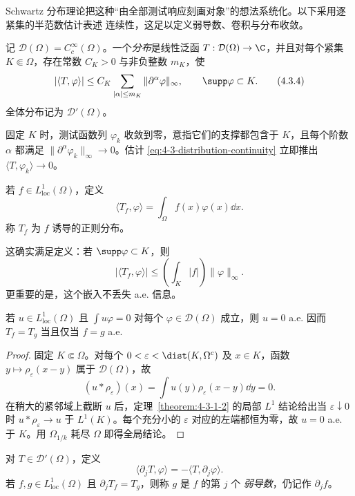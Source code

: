 Schwartz 分布理论把这种“由全部测试响应刻画对象”的想法系统化。以下采用逐紧集的半范数估计表述
连续性，这足以定义弱导数、卷积与分布收敛。

\begin{definition}[测试函数与分布]\label{def:4-3-2-1}
记 $\mathcal D(\Omega)=C_c^\infty(\Omega)$。一个\emph{分布}是线性泛函
$T:\mathcal D(\Omega)\to\C$，并且对每个紧集 $K\Subset\Omega$，存在常数
$C_K>0$ 与非负整数 $m_K$，使
\[
 |\langle T,\varphi\rangle|
 \leq C_K\sum_{|\alpha|\leq m_K}\|\partial^\alpha\varphi\|_\infty,
 \qquad \supp\varphi\subset K.
 \tag{4.3.4}\label{eq:4-3-distribution-continuity}
\]
全体分布记为 $\mathcal D'(\Omega)$。
\end{definition}

固定 $K$ 时，测试函数列 $\varphi_k$ 收敛到零，意指它们的支撑都包含于 $K$，且每个阶数
$\alpha$ 都满足 $\|\partial^\alpha\varphi_k\|_\infty\to0$。估计
\eqref{eq:4-3-distribution-continuity} 立即推出
$\langle T,\varphi_k\rangle\to0$。

\begin{definition}[正则分布]\label{def:4-3-2-2}
若 $f\in L^1_{\mathrm{loc}}(\Omega)$，定义
\[
 \langle T_f,\varphi\rangle=\int_\Omega f(x)\varphi(x)\dd x.
\]
称 $T_f$ 为 $f$ 诱导的正则分布。
\end{definition}

这确实满足定义：若 $\supp\varphi\subset K$，则
\[
 |\langle T_f,\varphi\rangle|
 \leq\left(\int_K|f|\right)\|\varphi\|_\infty.
\]
更重要的是，这个嵌入不丢失 a.e. 信息。

\begin{lemma}[测试函数识别局部可积函数]\label{lemma:4-3-2-regular-injective}
若 $u\in L^1_{\mathrm{loc}}(\Omega)$ 且
$\int u\varphi=0$ 对每个 $\varphi\in\mathcal D(\Omega)$ 成立，则 $u=0$ a.e.
因而 $T_f=T_g$ 当且仅当 $f=g$ a.e.
\end{lemma}

\begin{proof}
固定 $K\Subset\Omega$。对每个 $0<\varepsilon<\dist(K,\Omega^c)$ 及 $x\in K$，函数
$y\mapsto\rho_\varepsilon(x-y)$ 属于 $\mathcal D(\Omega)$，故
\[
 (u*\rho_\varepsilon)(x)
 =\int u(y)\rho_\varepsilon(x-y)\dd y=0.
\]
在稍大的紧邻域上截断 $u$ 后，定理~\ref{theorem:4-3-1-2} 的局部 $L^1$ 结论给出当
$\varepsilon\downarrow0$ 时 $u*\rho_\varepsilon\to u$ 于 $L^1(K)$。每个充分小的 $\varepsilon$
对应的左端都恒为零，故 $u=0$ a.e. 于 $K$。用
$\Omega_{1/k}$ 耗尽 $\Omega$ 即得全局结论。
\end{proof}

\begin{definition}[分布导数与弱导数]\label{def:4-3-2-3}
对 $T\in\mathcal D'(\Omega)$，定义
\[
 \langle\partial_jT,\varphi\rangle
 =-\langle T,\partial_j\varphi\rangle.
 \tag{4.3.5}\label{eq:4-3-distribution-derivative}
\]
若 $f,g\in L^1_{\mathrm{loc}}(\Omega)$ 且 $\partial_jT_f=T_g$，则称 $g$ 是 $f$ 的第 $j$ 个
\emph{弱导数}，仍记作 $\partial_jf$。
\end{definition}

